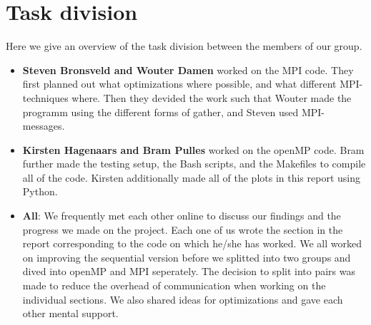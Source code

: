 \documentclass[a4paper]{article}
\begin{document}
\section{Task division}
Here we give an overview of the task division between the members of our group.
\begin{itemize}
    \item \textbf{Steven Bronsveld and Wouter Damen} worked on the MPI code. They first planned out what optimizations where possible, and what different MPI-techniques where. Then they devided the work such that Wouter made the programm using the different forms of gather, and Steven used MPI-messages.
    \item \textbf{Kirsten Hagenaars and Bram Pulles} worked on the openMP code. Bram further made the testing setup, the Bash scripts, and the Makefiles to compile all of the code. Kirsten additionally made all of the plots in this report using Python.
    \item \textbf{All}: We frequently met each other online to discuss our findings and the progress we made on the project. Each one of us wrote the section in the report corresponding to the code on which he/she has worked. We all worked on improving the sequential version before we splitted into two groups and dived into openMP and MPI seperately. The decision to split into pairs was made to reduce the overhead of communication when working on the individual sections. We also shared ideas for optimizations and gave each other mental support.
\end{itemize}
\end{document}
